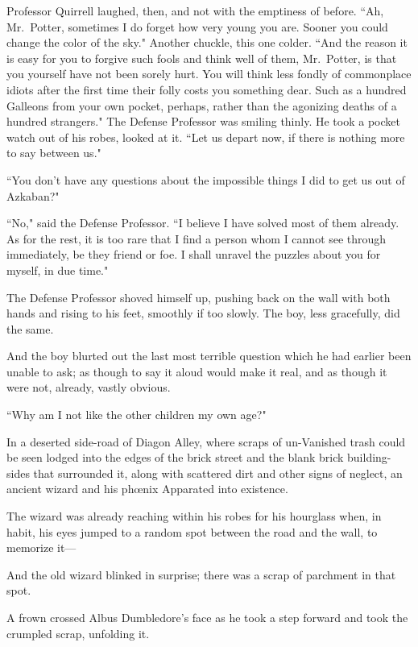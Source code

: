 Professor Quirrell laughed, then, and not with the emptiness of before. ``Ah, Mr.~Potter, sometimes I do forget how very young you are. Sooner you could change the color of the sky." Another chuckle, this one colder. ``And the reason it is easy for you to forgive such fools and think well of them, Mr.~Potter, is that you yourself have not been sorely hurt. You will think less fondly of commonplace idiots after the first time their folly costs you something dear. Such as a hundred Galleons from your own pocket, perhaps, rather than the agonizing deaths of a hundred strangers." The Defense Professor was smiling thinly. He took a pocket watch out of his robes, looked at it. ``Let us depart now, if there is nothing more to say between us."

``You don't have any questions about the impossible things I did to get us out of Azkaban?"

``No," said the Defense Professor. ``I believe I have solved most of them already. As for the rest, it is too rare that I find a person whom I cannot see through immediately, be they friend or foe. I shall unravel the puzzles about you for myself, in due time."

The Defense Professor shoved himself up, pushing back on the wall with both hands and rising to his feet, smoothly if too slowly. The boy, less gracefully, did the same.

And the boy blurted out the last most terrible question which he had earlier been unable to ask; as though to say it aloud would make it real, and as though it were not, already, vastly obvious.

``Why am I not like the other children my own age?"

\later

In a deserted side-road of Diagon Alley, where scraps of un-Vanished trash could be seen lodged into the edges of the brick street and the blank brick building-sides that surrounded it, along with scattered dirt and other signs of neglect, an ancient wizard and his phœnix Apparated into existence.

The wizard was already reaching within his robes for his hourglass when, in habit, his eyes jumped to a random spot between the road and the wall, to memorize it—

And the old wizard blinked in surprise; there was a scrap of parchment in that spot.

A frown crossed Albus Dumbledore's face as he took a step forward and took the crumpled scrap, unfolding it.

